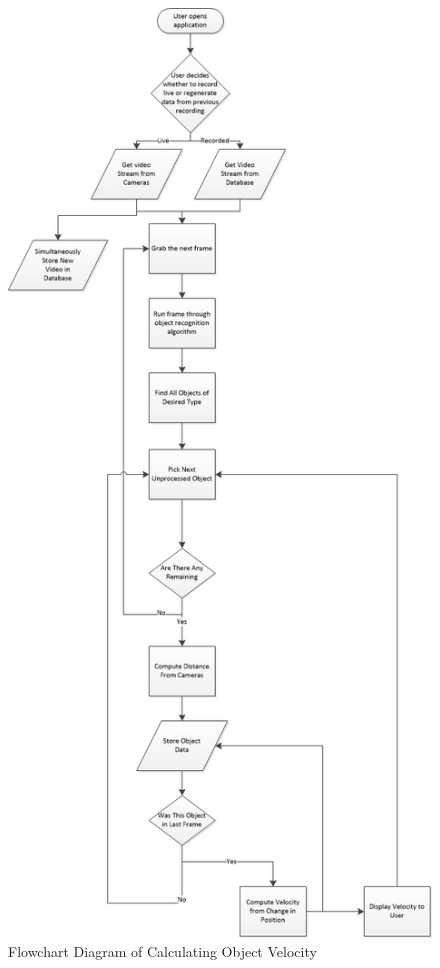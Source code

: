 \documentclass[onecolumn, draftclsnofoot,10pt, compsoc]{IEEEtran}
\begin{document}
\begin{figure}[H]
\includegraphics[scale=.68]{flowchart}
\caption{Flowchart Diagram of Calculating Object Velocity}
\label{fig:flowchart}
\end{figure}
\end{document}
